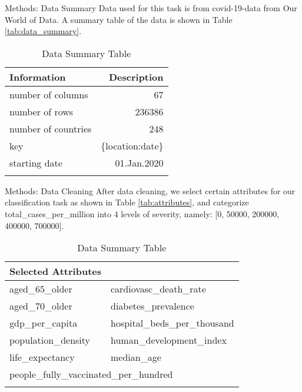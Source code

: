 \begin{frame}{Methods: Data Summary}
Data used for this task is from covid-19-data from Our World of Data. A summary table of the data is shown in Table \autoref{tab:data_summary}.
\begin{table}
	\caption{Data Summary Table}
	\centering
	\begin{tabular}{lr}
		\toprule
		\textbf{Information} & \textbf{Description} \\
		\midrule
		number of columns & 67 \\
		number of rows & 236386 \\
		number of countries & 248 \\
		key & \{location:date\}\\
		starting date & 01.Jan.2020\\
		\bottomrule
	\label{tab:data_summary}
	\end{tabular}
\end{table}
\end{frame}

\begin{frame}{Methods: Data Cleaning}
After data cleaning, we select certain attributes for our classification task as shown in Table \autoref{tab:attributes}, and categorize total\_cases\_per\_million into 4 levels of severity, namely: [0, 50000, 200000, 400000, 700000].
\\
\begin{table}
	\caption{Data Summary Table}
	\centering
	\begin{tabular}{ll}
		\toprule
		\textbf{Selected Attributes} &  \\
		\midrule
		aged\_65\_older & cardiovasc\_death\_rate \\
		aged\_70\_older & diabetes\_prevalence \\
		gdp\_per\_capita & hospital\_beds\_per\_thousand \\
		population\_density & human\_development\_index \\
		life\_expectancy & median\_age \\
		\multicolumn{2}{l}{people\_fully\_vaccinated\_per\_hundred} \\
		\bottomrule
	\label{tab:attributes}
	\end{tabular}
\end{table}
\end{frame}

